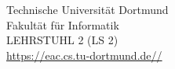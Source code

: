 \begin{titlepage}
    \vspace*{2.5cm}
    \hspace*{\links}
    \begin{minipage}[b]{8cm}

        \center
        Technische Universität Dortmund \\
        Fakultät für Informatik\\
        LEHRSTUHL 2 (LS 2)\\
        \url{https://eac.cs.tu-dortmund.de//}

    \end{minipage}

\end{titlepage}
